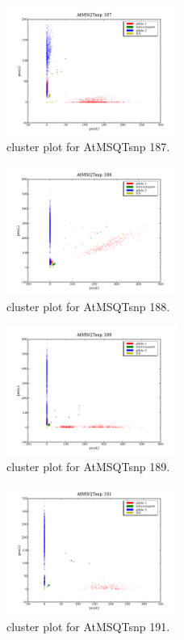 \begin{figure}[H]
\includegraphics[width=0.5\textwidth]{figures/cluster_plot_AtMSQTsnp_187.png}
\caption{cluster plot for AtMSQTsnp 187.} \label{flAtMSQTsnp187}
\end{figure}
\begin{figure}[H]
\includegraphics[width=0.5\textwidth]{figures/cluster_plot_AtMSQTsnp_188.png}
\caption{cluster plot for AtMSQTsnp 188.} \label{flAtMSQTsnp188}
\end{figure}
\begin{figure}[H]
\includegraphics[width=0.5\textwidth]{figures/cluster_plot_AtMSQTsnp_189.png}
\caption{cluster plot for AtMSQTsnp 189.} \label{flAtMSQTsnp189}
\end{figure}
\begin{figure}[H]
\includegraphics[width=0.5\textwidth]{figures/cluster_plot_AtMSQTsnp_191.png}
\caption{cluster plot for AtMSQTsnp 191.} \label{flAtMSQTsnp191}
\end{figure}
